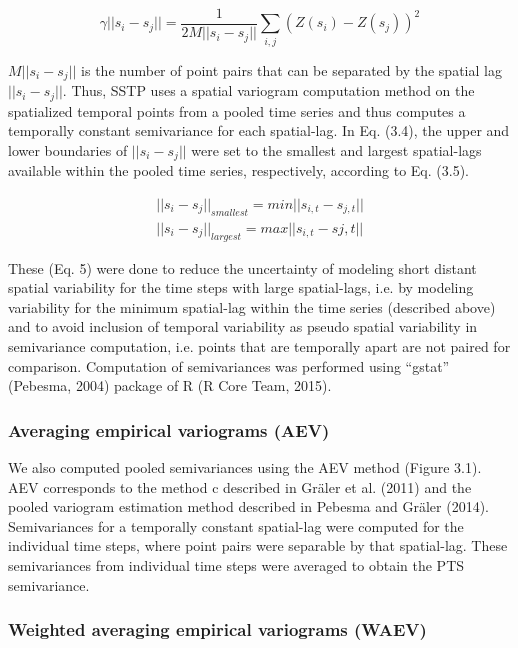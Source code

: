\begin{equation}
\gamma||s_i-s_j||=\frac{1}{2M||s_i-s_j||}\sum_{i,j}(Z(s_i)-Z(s_j))^2
\end{equation}

$M||s_i-s_j||$ is the number of point pairs that can be separated by the spatial lag $||s_i-s_j||$. Thus, SSTP uses a spatial variogram  computation method on the spatialized temporal points from a pooled time series and thus computes a temporally constant semivariance for each spatial-lag. In Eq. (3.4), the upper and lower boundaries of $||s_i-s_j||$ were set to the smallest and largest spatial-lags available within the pooled time series, respectively, according to Eq. (3.5).

\begin{equation}
\begin{split}
||s_i-s_j||_{smallest}=min||s_{i,t}-s_{j,t}||\\
||s_i-s_j||_{largest}=max||s_{i,t}-s{j,t}||
\end{split}
\end{equation}

These (Eq. 5) were done to reduce the uncertainty of modeling short distant spatial variability for the time steps with large spatial-lags, i.e. by modeling variability for the minimum spatial-lag within the time series (described above) and to avoid inclusion of temporal variability as pseudo spatial variability in semivariance computation, i.e. points that are temporally apart are not paired for comparison. Computation of semivariances was performed using “gstat” (Pebesma, 2004) package of R (R Core Team, 2015).

\subsubsection{Averaging empirical variograms (AEV)}
\label{Averaging empirical variograms (AEV)}

We also computed pooled semivariances using the AEV method (Figure 3.1). AEV corresponds to the method c described in Gräler et al. (2011) and the pooled variogram estimation method described in Pebesma and Gräler (2014). Semivariances for a temporally constant spatial-lag were computed for the individual time steps, where point pairs were separable by that spatial-lag. These semivariances from individual time steps were averaged to obtain the PTS semivariance.

\subsubsection{Weighted averaging empirical variograms (WAEV)}
\label{Weighted averaging empirical variograms (WAEV)}

